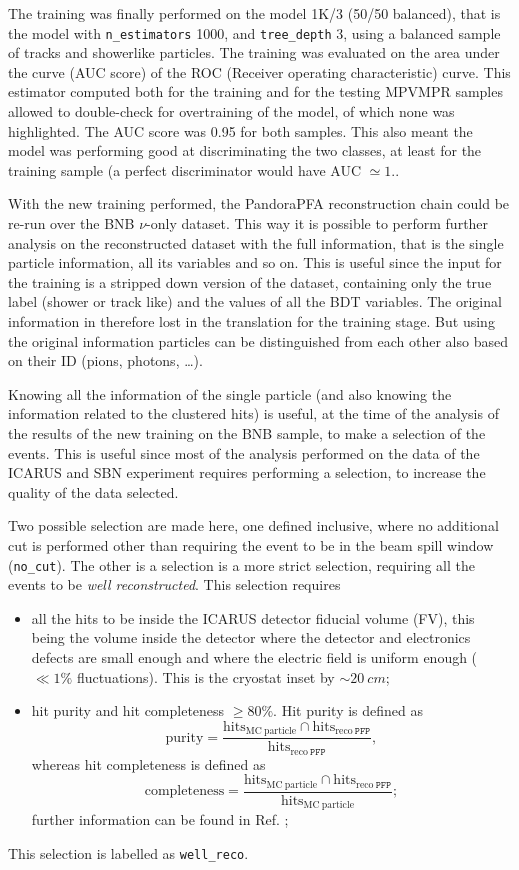 The training was finally performed on the model 1K/3 (50/50 balanced), that is the model with \verb=n_estimators= 1000, and \verb=tree_depth= 3, using a balanced sample of tracks and showerlike particles. The training was evaluated on the area under the curve (AUC score) of the ROC (Receiver operating characteristic) curve. This estimator computed both for the training and for the testing MPVMPR samples allowed to double-check for overtraining of the model, of which none was highlighted. The AUC score was 0.95 for both samples. This also meant the model was performing good at discriminating the two classes, at least for the training sample (a perfect discriminator would have AUC $\simeq 1.$. 

With the new training performed, the PandoraPFA reconstruction chain could be re-run over the BNB $\nu$-only dataset. This way it is possible to perform further analysis on the reconstructed dataset with the full information, that is the single particle information, all its variables and so on. This is useful since the input for the training is a stripped down version of the dataset, containing only the true label (shower or track like) and the values of all the BDT variables. The original information in therefore lost in the translation for the training stage. But using the original information particles can be distinguished from each other also based on their ID (pions, photons, \dots). 

Knowing all the information of the single particle (and also knowing the information related to the clustered hits) is useful, at the time of the analysis of the results of the new training on the BNB sample, to make a selection of the events. This is useful since most of the analysis performed on the data of the ICARUS and SBN experiment requires performing a selection, to increase the quality of the data selected. 

Two possible selection are made here, one defined inclusive, where no additional cut is performed other than requiring the event to be in the beam spill window (\texttt{no\_cut}). The other is a selection is a more strict selection, requiring all the events to be \emph{well reconstructed}. This selection requires \begin{itemize}
    \item all the hits to be inside the ICARUS detector fiducial volume (FV), this being the volume inside the detector where the detector and electronics defects are small enough and where the electric field is uniform enough ($\ll1\%$ fluctuations). This is the cryostat inset by $\sim \SI{20}{cm}$;
    \item hit purity and hit completeness $\geq 80\%$. Hit purity is defined as \[
        \mathrm{purity} = \frac{\mathrm{hits_{MC~particle}\cap\mathrm{hits_{reco~\texttt{PFP}}}}}{\mathrm{hits_{reco~\texttt{PFP}}}}, 
    \] whereas hit completeness is defined as \[
        \mathrm{completeness} = \frac{\mathrm{hits_{MC~particle}}\cap\mathrm{hits_{reco~\texttt{PFP}}}}{\mathrm{hits_{MC~particle}}};
    \] further information can be found in Ref. \cite{Sotgia:2024d};
\end{itemize} This selection is labelled as \texttt{well\_reco}. 

